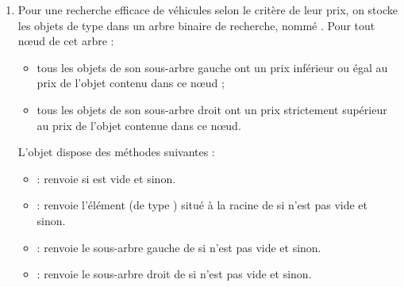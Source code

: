 \documentclass[11pt,a4paper,french,twoside]{PMCours}
\begin{document}
\begin{enumerate}
\item Pour une recherche efficace de véhicules selon le critère de leur prix, on
stocke les objets de type  dans un arbre binaire de recherche, nommé . Pour tout
nœud de cet arbre :
\begin{itemize}
\item tous les objets de son sous-arbre gauche ont un prix inférieur ou égal au prix de l'objet contenu dans ce nœud ;
\item tous les objets de son sous-arbre droit ont un prix strictement supérieur au prix de l'objet contenue dans ce nœud.
\end{itemize}

L'objet  dispose des méthodes suivantes :
\begin{itemize}
\item[]  : renvoie  si  est vide et  sinon.
\item[]  : renvoie l'élément (de type ) situé à la racine de  si  n'est
pas vide et  sinon.
\item[]  : renvoie le sous-arbre gauche de  si  n'est pas vide et 
sinon.
\item[]  : renvoie le sous-arbre droit de  si  n'est pas vide et  sinon.
\end{itemize}


\end{enumerate}
\end{document}

